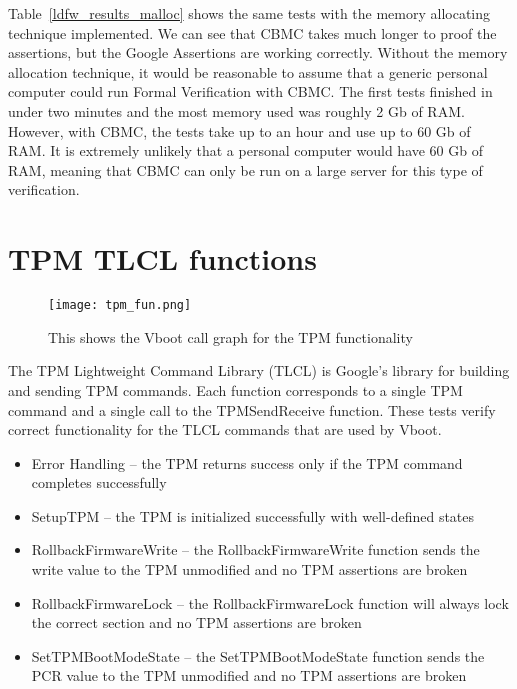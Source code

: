 Table~\ref{ldfw_results_malloc} shows the same tests with the memory allocating technique implemented.
We can see that CBMC takes much longer to proof the assertions, but the Google Assertions are working correctly.
Without the memory allocation technique, it would be reasonable to assume that a generic personal computer could run Formal Verification with CBMC. 
The first tests finished in under two minutes and the most memory used was roughly 2 Gb of RAM.
However, with CBMC, the tests take up to an hour and use up to 60 Gb of RAM.
It is extremely unlikely that a personal computer would have 60 Gb of RAM, meaning that CBMC can only be run on a large server for this type of verification. 

\section{TPM TLCL functions}

\begin{figure}[!htbp]
  \centering
  \texttt{[image: tpm\_fun.png]}
  \caption[TPM Call Graph]{This shows the Vboot call graph for the TPM functionality}\label{fig:tpm_call_graph}
\end{figure}

The TPM Lightweight Command Library (TLCL) is Google's library for building and sending TPM commands.
Each function corresponds to a single TPM command and a single call to the TPMSendReceive function.
These tests verify correct functionality for the TLCL commands that are used by Vboot. 

\begin{itemize}
   \item Error Handling --  the TPM returns success only if the TPM command completes successfully
    \item SetupTPM -- the TPM is initialized successfully with well-defined states
    \item  RollbackFirmwareWrite -- the RollbackFirmwareWrite function sends the write value to the TPM unmodified and no TPM assertions are broken
    \item  RollbackFirmwareLock -- the RollbackFirmwareLock function will always lock the correct section and no TPM assertions are broken
    \item SetTPMBootModeState -- the SetTPMBootModeState function sends the PCR value to the TPM unmodified and no TPM assertions are broken

\end{itemize}

